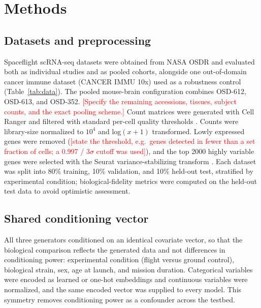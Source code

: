 \documentclass[11pt]{article}
\newcommand{\res}[1]{\textcolor{red}{[#1]}}
\begin{document}
\section{Methods}

\subsection{Datasets and preprocessing}
Spaceflight scRNA-seq datasets were obtained from NASA OSDR and evaluated both as individual studies and as pooled cohorts, alongside one out-of-domain cancer immune dataset (CANCER IMMU 10x) used as a robustness control (Table~\ref{tab:data}). The pooled mouse-brain configuration combines OSD-612, OSD-613, and OSD-352. \res{Specify the remaining accessions, tissues, subject counts, and the exact pooling scheme.} Count matrices were generated with Cell Ranger and filtered with standard per-cell quality thresholds \cite{tenx}. Counts were library-size normalized to $10^4$ and log$(x+1)$ transformed. Lowly expressed genes were removed (\res{state the threshold, e.g.\ genes detected in fewer than a set fraction of cells; a $0.997$ / $3\sigma$ cutoff was used}), and the top 2000 highly variable genes were selected with the Seurat variance-stabilizing transform \cite{seurat}. Each dataset was split into 80\% training, 10\% validation, and 10\% held-out test, stratified by experimental condition; biological-fidelity metrics were computed on the held-out test data to avoid optimistic assessment.

\subsection{Shared conditioning vector}
All three generators conditioned on an identical covariate vector, so that the biological comparison reflects the generated data and not differences in conditioning power: experimental condition (flight versus ground control), biological strain, sex, age at launch, and mission duration. Categorical variables were encoded as learned or one-hot embeddings and continuous variables were normalized, and the same encoded vector was supplied to every model. This symmetry removes conditioning power as a confounder across the testbed.
\end{document}
